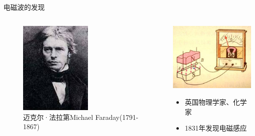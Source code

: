 \documentclass{beamer}
\begin{document}
\begin{frame}{电磁波的发现}
  \begin{columns}
    \begin{column}{0.35\linewidth}
    \begin{figure}
      \includegraphics[width=3.5cm]{faraday.jpg}
      \caption{迈克尔·法拉第Michael Faraday(1791-1867)}
    \end{figure}
    \end{column}
    \hfill
    \begin{column}{0.65\linewidth}
      \includegraphics[width=4.5cm]{faradayexperiment.jpg}
      \begin{itemize}
        \item 英国物理学家、化学家
        \item 1831年发现电磁感应
      \end{itemize}
    \end{column}
  \end{columns}
\end{frame}
\end{document}
